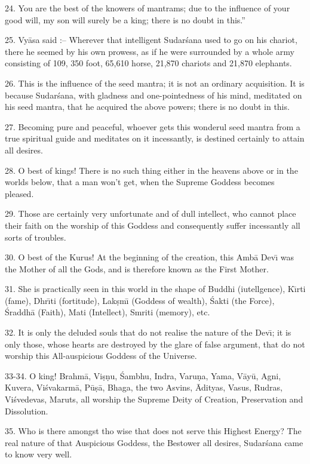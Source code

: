 24. You are the best of the knowers of mantrams; due to the influence of your good will, my son will surely be a king; there is no doubt in this.''

25. Vy\=asa said :-- Wherever that intelligent Sudar\'sana used to go on his chariot, there he seemed by his own prowess, as if he were surrounded by a whole army consisting of 109, 350 foot, 65,610 horse, 21,870 chariots and 21,870 elephants.

26. This is the influence of the seed mantra; it is not an ordinary acquisition. It is because Sudar\'sana, with gladness and one-pointedness of his mind, meditated on his seed mantra, that he acquired the above powers; there is no doubt in this.

27. Becoming pure and peaceful, whoever gets this wonderul seed mantra from a true spiritual guide and meditates on it incessantly, is destined certainly to attain all desires.

28. O best of kings! There is no such thing either in the heavens above or in the worlds below, that a man won't get, when the Supreme Goddess becomes pleased.

29. Those are certainly very unfortunate and of dull intellect, who cannot place their faith on the worship of this Goddess and consequently suffer incessantly all sorts of troubles.

30. O best of the Kurus! At the beginning of the creation, this Amb\=a Dev\={\i} was the Mother of all the Gods, and is therefore known as the First Mother.

31. She is practically seen in this world in the shape of Buddhi (iutellgence), K\={\i}rti (fame), Dhr\={\i}ti (fortitude), Lak\d{s}m\={\i} (Goddess of wealth), \'Sakti (the Force), \'Sraddh\=a (Faith), Mati (Intellect), Smriti (memory), etc.

32. It is only the deluded souls that do not realise the nature of the Dev\={\i}; it is only those, whose hearts are destroyed by the glare of false argument, that do not worship this All-auspicious Goddess of the Universe.

33-34. O king! Brahm\=a, Vi\d{s}\d{n}u, \'Sambhu, Indra, Varu\d{n}a, Yama, V\=ay\=u, Agni, Kuvera, Vi\'svakarm\=a, P\=u\d{s}\=a, Bhaga, the two Asvins, \=Adityas, Vasus, Rudras, Vi\'svedevas, Maruts, all worship the Supreme Deity of Creation, Preservation and Dissolution.

35. Who is there amongst tho wise that does not serve this Highest Energy? The real nature of that Auspicious Goddess, the Bestower all desires, Sudar\'sana came to know very well.

